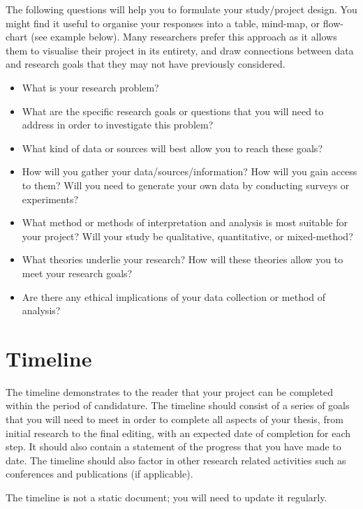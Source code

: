 \documentclass[12pt, a4paper]{article}
\begin{document}
The following questions will help you to formulate your study/project design. You might find it useful to organise your responses into a table, mind-map, or flow-chart (see example below). Many researchers prefer this approach as it allows them to visualise their project in its entirety, and draw connections between data and research goals that they may not have previously considered.
\begin{itemize}
\item What is your research problem?
\item What are the specific research goals or questions that you will need to address in order to investigate this problem?
\item What kind of data or sources will best allow you to reach these goals?
\item How will you gather your data/sources/information? How will you gain access to them? Will you need to generate your own data by conducting surveys or experiments?
\item What method or methods of interpretation and analysis is most suitable for your project? Will your study be qualitative, quantitative, or mixed-method?
\item What theories underlie your research? How will these theories allow you to meet your research goals?
\item Are there any ethical implications of your data collection or method of analysis?
\end{itemize}


\section{Timeline}
The timeline demonstrates to the reader that your project can be completed within the period of candidature. The timeline should consist of a series of goals that you will need to meet in order to complete all aspects of your thesis, from initial research to the final editing, with an expected date of completion for each step. It should also contain a statement of the progress that you have made to date. The timeline should also factor in other research related activities such as conferences and publications (if applicable).

The timeline is not a static document; you will need to update it regularly.


\end{document}
